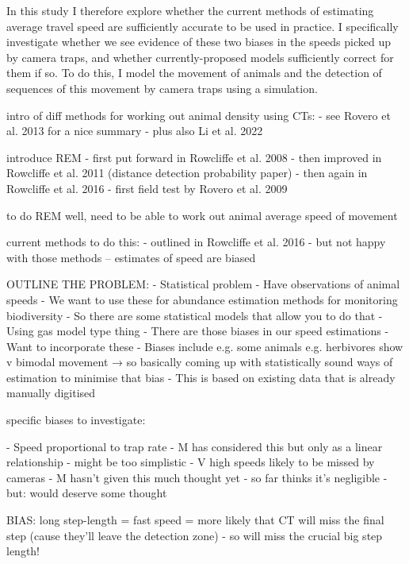 \documentclass[a4paper,12pt,twoside]{report}
\newcommand{\tocite}{\todo[color=red!40]{cite}}
\begin{document}
	In this study I therefore explore whether the current methods of estimating average travel speed are sufficiently accurate to be used in practice. I specifically investigate whether we see evidence of these two biases in the speeds picked up by camera traps, and whether currently-proposed models sufficiently correct for them if so. To do this, I model the movement of animals and the detection of sequences of this movement by camera traps using a simulation.  
	
	
	
	
	
	
	
	
	
	

	intro of diff methods for working out animal density using CTs:
	- see Rovero et al. 2013 for a nice summary
	- plus also Li et al. 2022 \tocite
	
	introduce REM
	- first put forward in Rowcliffe et al. 2008
	- then improved in Rowcliffe et al. 2011 (distance detection probability paper)
	- then again in Rowcliffe et al. 2016
	- first field test by Rovero et al. 2009
	
	to do REM well, need to be able to work out animal average speed of movement
	
	current methods to do this:
	- outlined in Rowcliffe et al. 2016
	- but not happy with those methods -- estimates of speed are biased
	
	
	OUTLINE THE PROBLEM:
	- Statistical problem
	- Have observations of animal speeds
	- We want to use these for abundance estimation methods for monitoring biodiversity
	- So there are some statistical models that allow you to do that
	- Using gas model type thing
	- There are those biases in our speed estimations
	- Want to incorporate these
	- Biases include e.g. some animals e.g. herbivores show v bimodal movement
			→ so basically coming up with statistically sound ways of estimation to minimise that bias
	- This is based on existing data that is already manually digitised
	
	
	specific biases to investigate:
	
	- Speed proportional to trap rate
		- M has considered this but only as a linear relationship - might be too simplistic
	- V high speeds likely to be missed by cameras
		- M hasn’t given this much thought yet - so far thinks it’s negligible - but: would deserve some thought


	BIAS: long step-length = fast speed = more likely that CT will miss the final step (cause they’ll leave the detection zone) - so will miss the crucial big step length!
	
\end{document}
